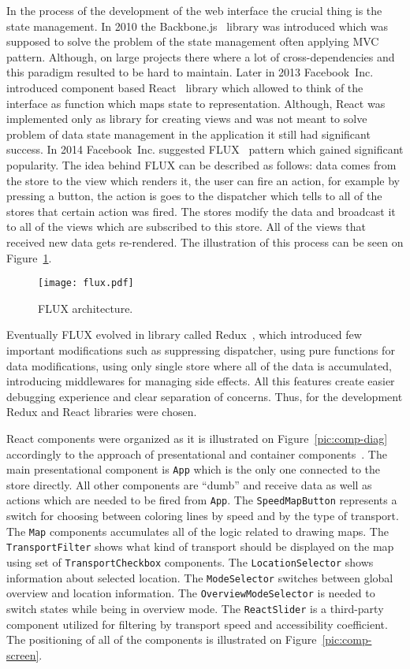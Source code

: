 In the process of the development of the web interface the crucial thing is the state management. In
2010 the Backbone.js~\cite{backbone} library was introduced which was supposed to solve the problem
of the state management often applying MVC~\cite{backbone:mvc} pattern. Although, on large projects
there where a lot of cross-dependencies and this paradigm resulted to be hard to maintain. Later in
2013 Facebook~Inc. introduced component based React~\cite{react} library which allowed to think of
the interface as function which maps state to representation. Although, React was implemented only
as library for creating views and was not meant to solve problem of data state management in the
application it still had significant success. In 2014 Facebook~Inc. suggested FLUX~\cite{flux}
pattern which gained significant popularity. The idea behind FLUX can be described as follows: data
comes from the store to the view which renders it, the user can fire an action, for example by
pressing a button, the action is goes to the dispatcher which tells to all of the stores that
certain action was fired. The stores modify the data and broadcast it to all of the views which are
subscribed to this store. All of the views that received new data gets re-rendered. The illustration
of this process can be seen on Figure~\ref{pic:flux}.

\begin{figure}[h]
  \centering
  \texttt{[image: flux.pdf]}
  \caption{FLUX architecture.}
  \label{pic:flux}
\end{figure}

Eventually FLUX evolved in library called Redux~\cite{redux}, which introduced few important
modifications such as suppressing dispatcher, using pure functions for data modifications, using
only single store where all of the data is accumulated, introducing middlewares for managing
side effects. All this features create easier debugging experience and clear separation
of concerns. Thus, for the development Redux and React libraries were chosen.

React components were organized as it is illustrated on Figure~\ref{pic:comp-diag} accordingly to
the approach of presentational and container components~\cite{redux:ppc}. The main presentational
component is \texttt{App} which is the only one connected to the store directly. All other
components are ``dumb'' and receive data as well as actions which are needed to be fired from
\texttt{App}. The \texttt{SpeedMapButton} represents a switch for choosing between coloring lines by
speed and by the type of transport. The \texttt{Map} components accumulates all of the logic related
to drawing maps. The \texttt{TransportFilter} shows what kind of transport should be displayed on
the map using set of \texttt{TransportCheckbox} components. The \texttt{LocationSelector} shows
information about selected location. The \texttt{ModeSelector} switches between global overview and
location information. The \texttt{OverviewModeSelector} is needed to switch states
while being in overview mode. The \texttt{ReactSlider} is a third-party component utilized
for filtering by transport speed and accessibility coefficient. The positioning of all of
the components is illustrated on Figure~\ref{pic:comp-screen}.


